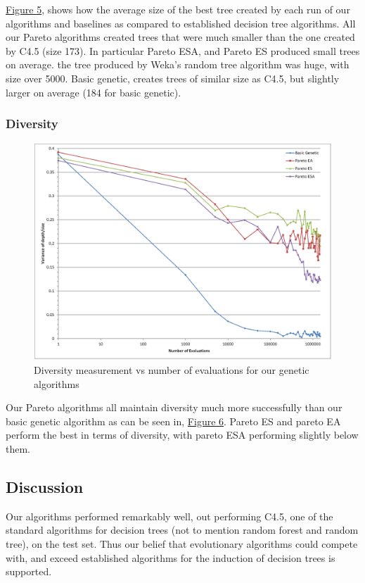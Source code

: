 \documentclass{acm_proc_article-sp}
\begin{document}
\hyperref[size]{Figure 5}, shows how the average size of the best tree created by each run of our algorithms and baselines as compared to established decision tree algorithms. All our Pareto algorithms created trees that were much smaller than the one created by C4.5 (size 173). In particular Pareto ESA, and Pareto ES produced small trees on average. the tree produced by Weka's random tree algorithm was huge, with size over 5000. Basic genetic, creates trees of similar size as C4.5, but slightly larger on average (184 for basic genetic).

\subsubsection{Diversity}

\begin{figure}[h]
\centering
\includegraphics[width=\linewidth]{diversity_chart.eps}
\caption{Diversity measurement vs number of evaluations for our genetic algorithms}\label{diversity}
\end{figure}

Our Pareto algorithms all maintain diversity much more successfully than our basic genetic algorithm as can be seen in, \hyperref[diversity]{Figure 6}. Pareto ES and pareto EA perform the best in terms of diversity, with pareto ESA performing slightly below them.

\subsection{Discussion}

Our algorithms performed remarkably well, out performing C4.5, one of the standard algorithms for decision trees (not to mention random forest and random tree), on the test set. Thus our belief that evolutionary algorithms could compete with, and exceed established algorithms for the induction of decision trees is supported.
\end{document}
